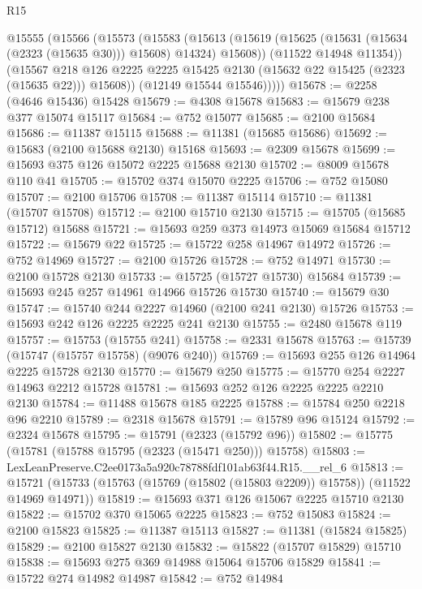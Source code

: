 \begin{lexlean}{R15}
\begin{coremodule}
        @15555
          (@15566
            (@15573
              (@15583
                (@15613
                  (@15619 (@15625 (@15631 (@15634 (@2323 (@15635 @30))) @15608) @14324) @15608))
                (@11522 @14948 @11354))
              (@15567
                @218
                @126
                @2225
                @2225
                @15425
                @2130
                (@15632 @22 @15425 (@2323 (@15635 @22)))
                @15608))
            (@12149 @15544 @15546)))))
@15678 := @2258 (@4646 @15436) @15428
@15679 := @4308 @15678
@15683 := @15679 @238 @377 @15074 @15117
@15684 := @752 @15077
@15685 := @2100 @15684
@15686 := @11387 @15115
@15688 := @11381 (@15685 @15686)
@15692 := @15683 (@2100 @15688 @2130) @15168
@15693 := @2309 @15678
@15699 := @15693 @375 @126 @15072 @2225 @15688 @2130
@15702 := @8009 @15678 @110 @41
@15705 := @15702 @374 @15070 @2225
@15706 := @752 @15080
@15707 := @2100 @15706
@15708 := @11387 @15114
@15710 := @11381 (@15707 @15708)
@15712 := @2100 @15710 @2130
@15715 := @15705 (@15685 @15712) @15688
@15721 := @15693 @259 @373 @14973 @15069 @15684 @15712
@15722 := @15679 @22
@15725 := @15722 @258 @14967 @14972
@15726 := @752 @14969
@15727 := @2100 @15726
@15728 := @752 @14971
@15730 := @2100 @15728 @2130
@15733 := @15725 (@15727 @15730) @15684
@15739 := @15693 @245 @257 @14961 @14966 @15726 @15730
@15740 := @15679 @30
@15747 := @15740 @244 @2227 @14960 (@2100 @241 @2130) @15726
@15753 := @15693 @242 @126 @2225 @2225 @241 @2130
@15755 := @2480 @15678 @119
@15757 := @15753 (@15755 @241)
@15758 := @2331 @15678
@15763 := @15739 (@15747 (@15757 @15758) (@9076 @240))
@15769 := @15693 @255 @126 @14964 @2225 @15728 @2130
@15770 := @15679 @250
@15775 := @15770 @254 @2227 @14963 @2212 @15728
@15781 := @15693 @252 @126 @2225 @2225 @2210 @2130
@15784 := @11488 @15678 @185 @2225
@15788 := @15784 @250 @2218 @96 @2210
@15789 := @2318 @15678
@15791 := @15789 @96 @15124
@15792 := @2324 @15678
@15795 := @15791 (@2323 (@15792 @96))
@15802 := @15775 (@15781 (@15788 @15795 (@2323 (@15471 @250))) @15758)
@15803 := LexLeanPreserve.C2ee0173a5a920c78788fdf101ab63f44.R15.__rel_6
@15813 := @15721 (@15733 (@15763 (@15769 (@15802 (@15803 @2209)) @15758)) (@11522 @14969 @14971))
@15819 := @15693 @371 @126 @15067 @2225 @15710 @2130
@15822 := @15702 @370 @15065 @2225
@15823 := @752 @15083
@15824 := @2100 @15823
@15825 := @11387 @15113
@15827 := @11381 (@15824 @15825)
@15829 := @2100 @15827 @2130
@15832 := @15822 (@15707 @15829) @15710
@15838 := @15693 @275 @369 @14988 @15064 @15706 @15829
@15841 := @15722 @274 @14982 @14987
@15842 := @752 @14984

\end{coremodule}
\end{lexlean}
